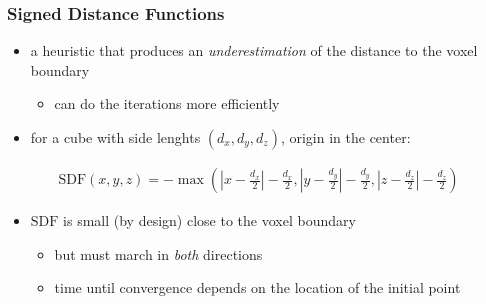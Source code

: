 \documentclass{beamer}
\begin{document}
\begin{frame}
  \frametitle{Signed Distance Functions}

  \begin{itemize}
  \item a heuristic that produces an \textsl{underestimation} of the distance to the voxel boundary
    \begin{itemize}
      \item can do the iterations more efficiently
    \end{itemize}
  \item for a cube with side lenghts $(d_x, d_y, d_z)$, origin in the center:
  \end{itemize}
  \begin{align*}
    \text{SDF}(x, y, z) = -\max\left(\left| x - \frac{d_x}{2} \right| - \frac{d_x}{2}, \left| y - \frac{d_y}{2} \right| - \frac{d_y}{2}, \left| z - \frac{d_z}{2} \right| - \frac{d_z}{2}\right)
  \end{align*}

  \begin{itemize}
  \item $\text{SDF}$ is small (by design) close to the voxel boundary
    \begin{itemize}
    \item but must march in \textsl{both} directions
    \item time until convergence depends on the location of the initial point
    \end{itemize}
  \end{itemize}
\end{frame}
\end{document}
